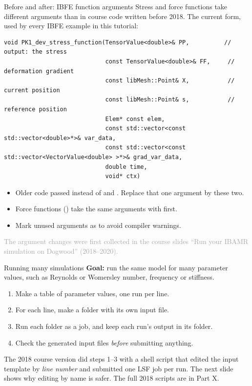 \documentclass[aspectratio=169,11pt]{beamer}
\newcommand{\sourcecredit}[1]{\vfill\hfill{\tiny\textcolor{DarkGray}{#1}}}
\begin{document}
\begin{frame}[fragile]{Before and after: IBFE function arguments}
Stress and force functions take different arguments than in course code written before 2018. The current form, used by every IBFE example in this tutorial:
\begin{lstlisting}[style=cpp,basicstyle=\ttfamily\tiny\color{BlackGray}]
void PK1_dev_stress_function(TensorValue<double>& PP,          // output: the stress
                             const TensorValue<double>& FF,     // deformation gradient
                             const libMesh::Point& X,           // current position
                             const libMesh::Point& s,           // reference position
                             Elem* const elem,
                             const std::vector<const std::vector<double>*>& var_data,
                             const std::vector<const std::vector<VectorValue<double> >*>& grad_var_data,
                             double time,
                             void* ctx)
\end{lstlisting}
\begin{itemize}\small
  \item Older code passed  instead of  and . Replace that one argument by these two.
  \item Force functions () take the same arguments with  first.
  \item Mark unused arguments as  to avoid compiler warnings.
\end{itemize}
\sourcecredit{The argument changes were first collected in the course slides ``Run your IBAMR simulation on Dogwood'' (2018--2020).}
\end{frame}

\begin{frame}{Running many simulations}
\textbf{Goal:} run the same model for many parameter values, such as Reynolds or Womersley number, frequency or stiffness.
\vspace{2mm}
\begin{enumerate}
  \item Make a table of parameter values, one run per line.
  \item For each line, make a folder with its own input file.
  \item Run each folder as a job, and keep each run's output in its folder.
  \item Check the generated input files \emph{before} submitting anything.
\end{enumerate}
\vspace{3mm}
\begin{punchbox}
\small The 2018 course version did steps 1--3 with a shell script that edited the input template by \emph{line number} and submitted one LSF job per run. The next slide shows why editing by name is safer. The full 2018 scripts are in Part X.
\end{punchbox}
\end{frame}
\end{document}
